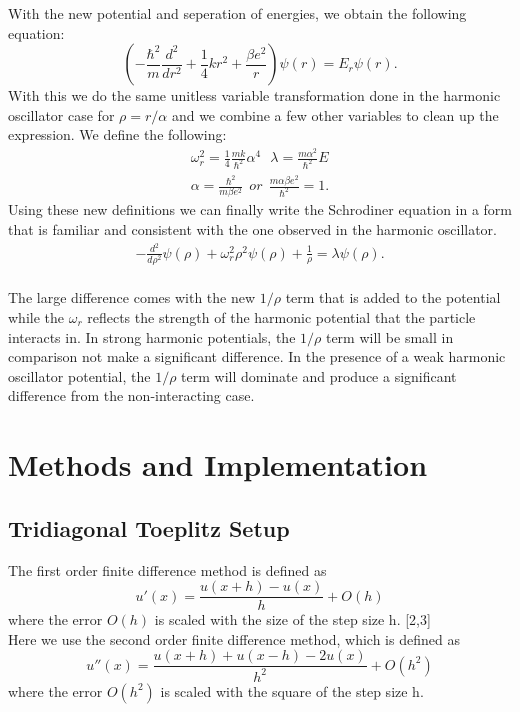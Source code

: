 \documentclass[%
 reprint,
 amsmath,amssymb,
 aps,
]{revtex4-1}
\begin{document}
With the new potential and seperation of energies, we obtain the following equation:
\[ \left( -\frac{\hbar^2}{m} \frac{d^2}{dr^2}+ \frac{1}{4}k r^2+\frac{\beta e^2}{r}\right)\psi(r) = E_r \psi(r). \]
With this we do the same unitless variable transformation done in the harmonic oscillator case for $\rho = r/\alpha$ and we combine a few other variables to clean up the expression. We define the following:
\begin{align*}
\omega_r^2=\frac{1}{4}\frac{mk}{\hbar^2} \alpha^4 \ \ \ \lambda = \frac{m\alpha^2}{\hbar^2}E\\
\alpha = \frac{\hbar^2}{m\beta e^2} \ \ or \ \ \frac{m\alpha \beta e^2}{\hbar^2}=1.
\end{align*}
Using these new definitions we can finally write the Schrodiner equation in a form that is familiar and consistent with the one observed in the harmonic oscillator.
\begin{align*}
 -\frac{d^2}{d\rho^2} \psi(\rho) + \omega_r^2\rho^2\psi(\rho) +\frac{1}{\rho} = \lambda \psi(\rho).
\end{align*}
\\

The large difference comes with the new $1/\rho$ term that is added to the potential while the $\omega_r$ reflects the strength of the harmonic potential that the particle interacts in. In strong harmonic potentials, the $1/\rho$ term will be small in comparison not make a significant difference. In the presence of a weak harmonic oscillator potential, the $1/\rho$ term will dominate and produce a significant difference from the non-interacting case. \\


\section{\label{sec:level1}Methods and Implementation}
\subsection{Tridiagonal Toeplitz Setup}
The first order finite difference method is defined as 
$$ u'(x) = \frac{u(x+h) - u(x)}{h} + O(h)$$
where the error $O(h)$ is scaled with the size of the step size h. [2,3]\\

Here we use the second order finite difference method, which is defined as
$$ u''(x) = \frac{u(x+h) + u(x-h) - 2u(x)}{h^2} + O(h^2)$$
where the error $O(h^2)$ is scaled with the square of the step size h.\\
\end{document}
